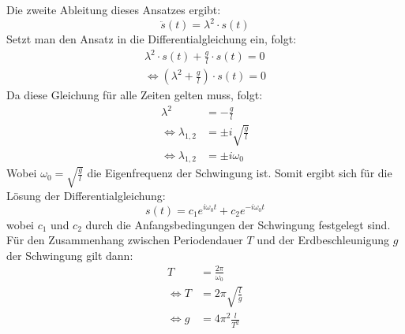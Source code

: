 \documentclass{report}
\begin{document}
Die zweite Ableitung dieses Ansatzes ergibt:
\begin{equation}
    \ddot{s}(t) = {\lambda}^2 \cdot s(t)
\end{equation}
Setzt man den Ansatz in die Differentialgleichung ein, folgt:
\begin{equation}
    \begin{split}
    {\lambda}^2 \cdot s(t) + \frac{g}{l} \cdot s(t) = 0 \\
    \Leftrightarrow ({\lambda}^2 + \frac{g}{l}) \cdot s(t) = 0
    \end{split}
\end{equation}
Da diese Gleichung für alle Zeiten gelten muss, folgt:
\begin{equation}
    \begin{split}
        {\lambda}^2 &= -\frac{g}{l} \\
        \Leftrightarrow \lambda_{1,2} &= \pm i\sqrt{\frac{g}{l}} \\
        \Leftrightarrow \lambda_{1,2} &= \pm i \omega_0
    \end{split}
\end{equation}
Wobei $\omega_0 = \sqrt{\frac{g}{l}}$ die Eigenfrequenz der Schwingung ist.
Somit ergibt sich für die Lösung der Differentialgleichung:
\begin{equation}
    s(t) = c_1 e^{i \omega_0 t} + c_2 e^{-i \omega_0 t}
\end{equation}
wobei $c_1$ und $c_2$ durch die Anfangsbedingungen der Schwingung festgelegt sind.
Für den Zusammenhang zwischen Periodendauer $T$ und der Erdbeschleunigung $g$ der Schwingung gilt dann:
\begin{equation}
    \begin{split}
        T &= \frac{2 \pi}{\omega_0} \\
        \Leftrightarrow T &= 2 \pi \sqrt{\frac{l}{g}} \\
        \Leftrightarrow g &= 4 {\pi}^2 \frac{l}{T^2}
    \end{split}
    \label{eq:gAusT}
\end{equation}
\end{document}
